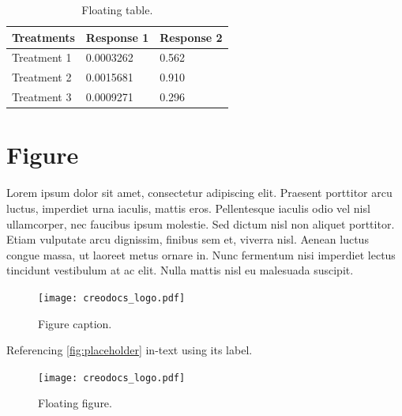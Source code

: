 \documentclass[
	11pt, %
	fleqn, %
	a4paper, %
]{LegrandOrangeBook}
\begin{document}
\begin{table}[t] %
	\centering %
	\begin{tabular}{L{0.15\textwidth} R{0.15\textwidth} R{0.15\textwidth}} %
		\toprule
		\textbf{Treatments} & \textbf{Response 1} & \textbf{Response 2}\\
		\midrule
		Treatment 1 & 0.0003262 & 0.562 \\
		Treatment 2 & 0.0015681 & 0.910 \\
		Treatment 3 & 0.0009271 & 0.296 \\
		\bottomrule
	\end{tabular}
	\caption{Floating table.}
	\label{tab:floating} %
\end{table}


\section{Figure}

Lorem ipsum dolor sit amet, consectetur adipiscing elit. Praesent porttitor arcu luctus, imperdiet urna iaculis, mattis eros. Pellentesque iaculis odio vel nisl ullamcorper, nec faucibus ipsum molestie. Sed dictum nisl non aliquet porttitor. Etiam vulputate arcu dignissim, finibus sem et, viverra nisl. Aenean luctus congue massa, ut laoreet metus ornare in. Nunc fermentum nisi imperdiet lectus tincidunt vestibulum at ac elit. Nulla mattis nisl eu malesuada suscipit.

\begin{figure}[H] %
	\centering %
	\texttt{[image: creodocs\_logo.pdf]} %
	\caption{Figure caption.}
	\label{fig:placeholder} %
\end{figure}

Referencing \autoref{fig:placeholder} in-text using its label.

\begin{figure}[b] %
	\centering %
	\texttt{[image: creodocs\_logo.pdf]} %
	\caption{Floating figure.}
	\label{fig:floating} %
\end{figure}
\end{document}
